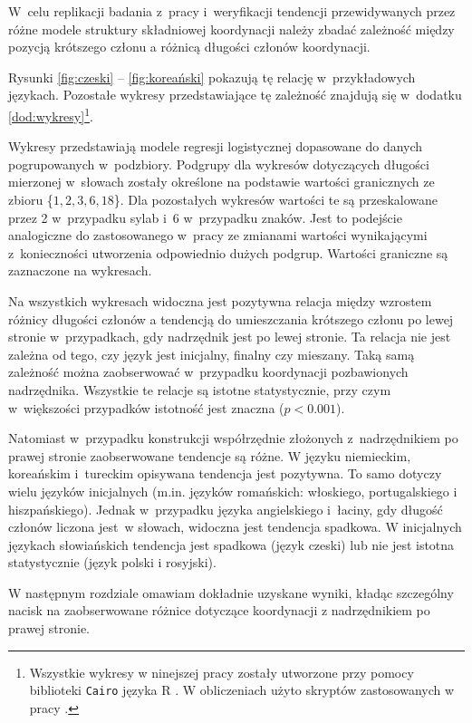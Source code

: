 W~celu replikacji badania z~pracy \cite{przepiorkowski2023conjunct} i~weryfikacji tendencji przewidywanych przez różne modele struktury składniowej koordynacji należy zbadać zależność między pozycją krótszego członu a różnicą długości członów koordynacji.

Rysunki \ref{fig:czeski} -- \ref{fig:koreański} pokazują tę relację w~przykładowych językach. Pozostałe wykresy przedstawiające tę zależność znajdują się w~dodatku \ref{dod:wykresy}\footnote{
Wszystkie wykresy w ninejszej pracy zostały utworzone przy pomocy biblioteki \texttt{Cairo} języka R \citep{R2023}. W obliczeniach użyto skryptów zastosowanych w pracy \cite{przepiorkowski2023conjunct}.}.

Wykresy przedstawiają modele regresji logistycznej dopasowane do danych pogrupowanych w~podzbiory. Podgrupy dla wykresów dotyczących długości mierzonej w~słowach zostały określone na podstawie wartości granicznych ze zbioru \{$1, 2, 3, 6, 18$\}. Dla pozostałych wykresów wartości te są przeskalowane przez 2 w~przypadku sylab i~6 w~przypadku znaków. Jest to podejście analogiczne do zastosowanego w~pracy \cite{przepiorkowski2023conjunct} ze zmianami wartości wynikającymi z~konieczności utworzenia odpowiednio dużych podgrup. Wartości graniczne są zaznaczone na wykresach. 

Na wszystkich wykresach widoczna jest pozytywna relacja między wzrostem różnicy długości członów a tendencją do umieszczania krótszego członu po lewej stronie w~przypadkach, gdy nadrzędnik jest po lewej stronie. Ta relacja nie jest zależna od tego, czy język jest inicjalny, finalny czy mieszany. Taką samą zależność można zaobserwować w~przypadku koordynacji pozbawionych nadrzędnika. Wszystkie te relacje są istotne statystycznie, przy czym w~większości przypadków istotność jest znaczna ($p<0.001$).

Natomiast w~przypadku konstrukcji współrzędnie złożonych z~nadrzędnikiem po prawej stronie zaobserwowane tendencje są różne. W języku niemieckim, koreańskim i~tureckim opisywana tendencja jest pozytywna. To samo dotyczy wielu języków inicjalnych (m.in. języków romańskich: włoskiego,  portugalskiego i hiszpańskiego). Jednak w~przypadku języka angielskiego i~łaciny, gdy długość członów liczona jest~w słowach, widoczna jest tendencja spadkowa. W inicjalnych językach słowiańskich tendencja jest spadkowa (język czeski) lub nie jest istotna statystycznie (język polski i rosyjski). 

W następnym rozdziale omawiam dokładnie uzyskane wyniki, kładąc szczególny nacisk na zaobserwowane różnice dotyczące koordynacji z nadrzędnikiem po prawej stronie.

